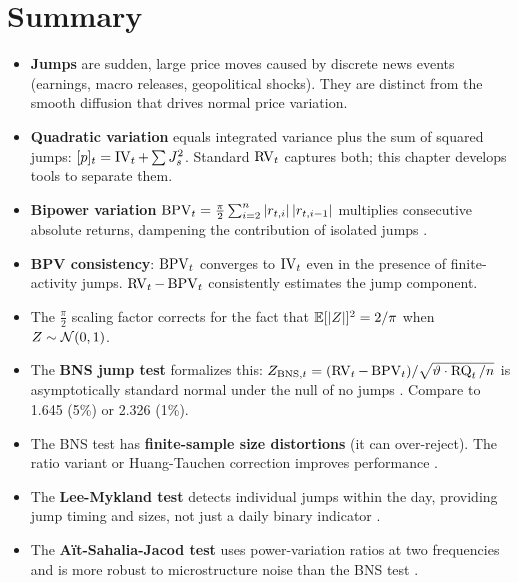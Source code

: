 \section*{Summary}

\begin{itemize}[nosep]
  \item \textbf{Jumps} are sudden, large price moves caused by discrete news events (earnings, macro releases, geopolitical shocks).  They are distinct from the smooth diffusion that drives normal price variation.

  \item \textbf{Quadratic variation} equals integrated variance plus the sum of squared jumps: $[p]_t = \operatorname{IV}_t + \sum J_s^2$.  Standard $\operatorname{RV}_t$ captures both; this chapter develops tools to separate them.

  \item \textbf{Bipower variation} $\operatorname{BPV}_t = \frac{\pi}{2}\sum_{i=2}^{n}|r_{t,i}|\,|r_{t,i-1}|$ multiplies consecutive absolute returns, dampening the contribution of isolated jumps \citep{BNS2004}.

  \item \textbf{BPV consistency}: $\operatorname{BPV}_t$ converges to $\operatorname{IV}_t$ even in the presence of finite-activity jumps.  $\operatorname{RV}_t - \operatorname{BPV}_t$ consistently estimates the jump component.

  \item The $\frac{\pi}{2}$ scaling factor corrects for the fact that $\mathbb{E}[|Z|]^2 = 2/\pi$ when $Z \sim \mathcal{N}(0,1)$.

  \item The \textbf{BNS jump test} formalizes this: $Z_{\text{BNS},t} = (\operatorname{RV}_t - \operatorname{BPV}_t)/\sqrt{\vartheta \cdot \operatorname{RQ}_t/n}$ is asymptotically standard normal under the null of no jumps \citep{BNS2006}.  Compare to 1.645 (5\%) or 2.326 (1\%).

  \item The BNS test has \textbf{finite-sample size distortions} (it can over-reject).  The ratio variant or Huang-Tauchen correction improves performance \citep{HuangTauchen2005}.

  \item The \textbf{Lee-Mykland test} detects individual jumps within the day, providing jump timing and sizes, not just a daily binary indicator \citep{LeeMykland2008}.

  \item The \textbf{A\"it-Sahalia-Jacod test} uses power-variation ratios at two frequencies and is more robust to microstructure noise than the BNS test \citep{AitSahaliaJacod2009}.


\end{itemize}
